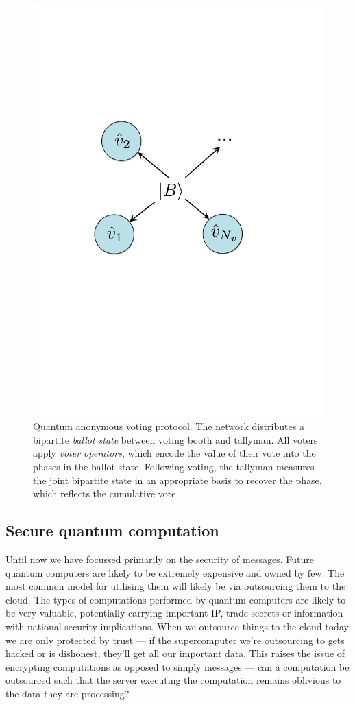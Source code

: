 \begin{figure}[!htb]
\includegraphics[width=0.6\columnwidth]{figures/quantum_voting}
\caption{Quantum anonymous voting protocol. The network distributes a bipartite \emph{ballot state} between voting booth and tallyman. All voters apply \emph{voter operators}, which encode the value of their vote into the phases in the ballot state. Following voting, the tallyman measures the joint bipartite state in an appropriate basis to recover the phase, which reflects the cumulative vote.} \label{fig:quantum_voting}
\end{figure}

\subsection{Secure quantum computation}

Until now we have focussed primarily on the security of messages. Future quantum computers are likely to be extremely expensive and owned by few. The most common model for utilising them will likely be via outsourcing them to the cloud. The types of computations performed by quantum computers are likely to be very valuable, potentially carrying important IP, trade secrets or information with national security implications. When we outsource things to the cloud today we are only protected by trust --- if the supercomputer we're outsourcing to gets hacked or is dishonest, they'll get all our important data. This raises the issue of encrypting computations as opposed to simply messages --- can a computation be outsourced such that the server executing the computation remains oblivious to the data they are processing?

